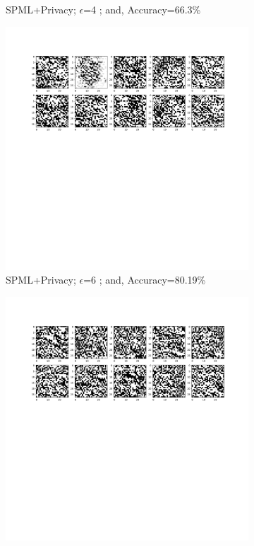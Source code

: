 \begin{figure}[h!]
\begin{subfigure}{.325\textwidth}
         \vspace{-8em}
         \caption{SPML+Privacy; $\epsilon$=4 ; and, Accuracy=66.3\%}
         \label{default}
     \end{subfigure}
     \begin{subfigure}{.325\textwidth}
         \includegraphics[width=\textwidth]{images/Native_attack/Mnistattack6.pdf}
         \vspace{-8em}
         \caption{SPML+Privacy; $\epsilon$=6 ; and, Accuracy=80.19\%}
         \label{default}
     \end{subfigure}
     \begin{subfigure}{.325\textwidth}
         \includegraphics[width=\textwidth]{images/Native_attack/Mnistattack8.pdf}

\end{subfigure}
\end{figure}
